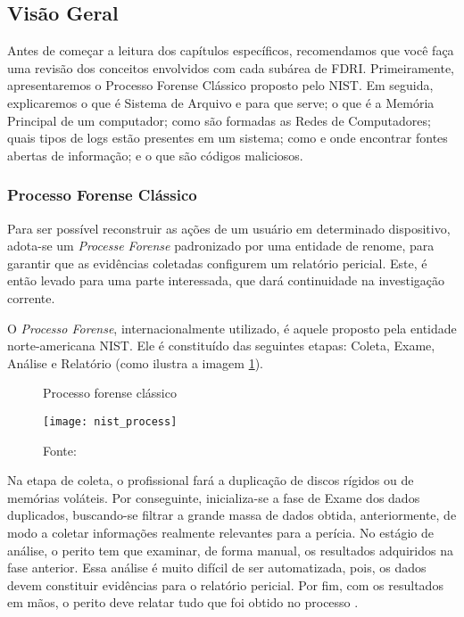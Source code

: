     \subsection{Visão Geral} \label{cap1_visao_geral}
    
    \hspace{1cm}
    Antes de começar a leitura dos capítulos específicos, recomendamos que você faça uma revisão dos conceitos envolvidos com cada subárea de FDRI. Primeiramente, apresentaremos o Processo Forense Clássico proposto pelo NIST. Em seguida, explicaremos o que é Sistema de Arquivo e para que serve; o que é a Memória Principal de um computador; como são formadas as Redes de Computadores; quais tipos de logs estão presentes em um sistema; como e onde encontrar fontes abertas de informação; e o que são códigos maliciosos.
    
    \subsubsection{Processo Forense Clássico} \label{cap1_visao_geral_procfor}
    
    \hspace{1cm}
    Para ser possível reconstruir as ações de um usuário em determinado dispositivo, adota-se um \textit{Processe Forense} padronizado por uma entidade de renome, para garantir que as evidências coletadas configurem um relatório pericial. Este, é então levado para uma parte interessada, que dará continuidade na investigação corrente.

    \vspace{4mm}

    \hspace{1cm}
    O \textit{Processo Forense}, internacionalmente utilizado, é aquele proposto pela entidade norte-americana NIST. Ele é constituído das seguintes etapas: Coleta, Exame, Análise e Relatório (como ilustra a imagem \ref{nist_proc}).

    \begin{figure}[H]
    	\centering
    	\caption{Processo forense clássico}
    	\texttt{[image: nist\_process]}
    	\caption*{Fonte: }
    	\label{nist_proc}
    \end{figure}
    
    \hspace{1cm}
    Na etapa de coleta, o profissional fará a duplicação de discos rígidos ou de memórias voláteis. Por conseguinte, inicializa-se a fase de Exame dos dados duplicados, buscando-se filtrar a grande massa de dados obtida, anteriormente, de modo a coletar informações realmente relevantes para a perícia. No estágio de análise, o perito tem que examinar, de forma manual, os resultados adquiridos na fase anterior. Essa análise é muito difícil de ser automatizada, pois, os dados devem constituir evidências para o relatório pericial. Por fim, com os resultados em mãos, o perito deve relatar tudo que foi obtido no processo \cite{kent2006}.
        
